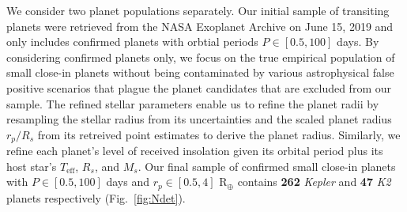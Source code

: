 \documentclass[modern]{aastex63}
\newcommand\kepler{\emph{Kepler}}
\newcommand\ktwo{\emph{K2}}
\newcommand\teff{$T_{\text{eff}}$}
\begin{document}
We consider two planet populations separately. Our initial sample of transiting planets were retrieved from the
NASA Exoplanet Archive \citep{akeson13} on June 15, 2019 and only includes confirmed
planets with orbtial periods $P \in [0.5,100]$ days. By considering confirmed
planets only, we focus on the true empirical population of small close-in planets without being
contaminated by various astrophysical false positive scenarios that plague the planet candidates that are
excluded from our sample. The refined stellar parameters enable us to refine the planet radii by resampling
the stellar radius from its uncertainties and the scaled planet radius $r_p/R_s$ from its retreived 
point estimates to derive the planet radius. Similarly, we refine each planet's level of received insolation
given its orbital period plus its host star's \teff{,} $R_s$, and $M_s$. 
Our final sample of confirmed small close-in planets with $P\in [0.5,100]$ days and $r_p\in [0.5,4]$ R$_{\oplus}$
contains \textbf{262} \kepler{} and \textbf{47} \ktwo{} planets respectively (Fig.~\ref{fig:Ndet}).
\end{document}

